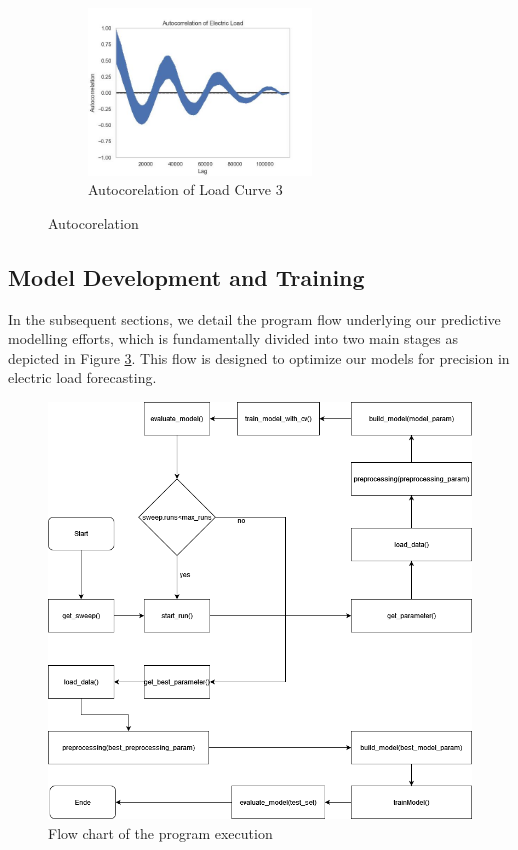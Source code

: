 \documentclass{article} %
\begin{document}
\begin{figure}[H]
    \begin{subfigure}[b]{\textwidth}
        \centering
        \includegraphics[width=0.65\textwidth]{ressources/Autocorrelation/lectricLoad_autocorrelation(2).jpg}
        \caption{Autocorelation of Load Curve 3}
        \label{fig:autocorrelation3}
    \end{subfigure}
    \caption{Autocorelation}
    \label{fig:autocorrelation}
\end{figure}


\subsection{Model Development and Training}
In the subsequent sections, we detail the program flow underlying our predictive modelling efforts, which is fundamentally divided into two main stages as depicted in Figure \ref{fig.:flowChart}. This flow is designed to optimize our models for precision in electric load forecasting. 
\begin{figure}[h]
\begin{center}
\includegraphics[width=\textwidth]{ressources/CSOAII.drawio(1).png}
\end{center}
\caption{Flow chart of the program execution}
\label{fig.:flowChart}
\end{figure}
\end{document}
